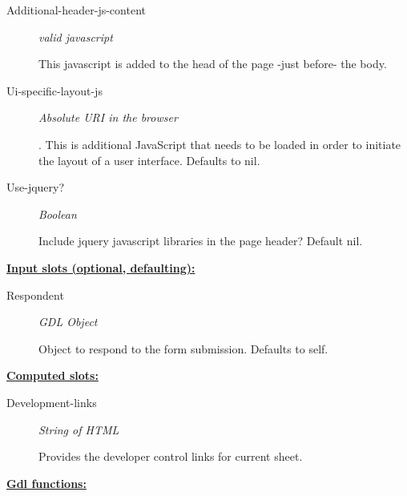 \documentclass [11pt]{book}
\begin{document}
\begin{itemize}
\begin{description}
\item [Additional-header-js-content]
\emph{valid javascript}

 This javascript is added to the head of the page -just before- the body.


\item [Ui-specific-layout-js]
\emph{Absolute URI in the browser}

.
This is additional JavaScript that needs to be loaded in order to initiate the layout of a user
interface. Defaults to nil.




\item [Use-jquery?]
\emph{Boolean}

 Include jquery javascript libraries in the page header?
Default nil.




\end{description}






\textbf{
\underline{Input slots (optional, defaulting):}}

\begin{description}

\item [Respondent]
\emph{GDL Object}

 Object to respond to the form submission. Defaults to self.




\end{description}






\textbf{
\underline{Computed slots:}}

\begin{description}

\item [Development-links]
\emph{String of HTML}

 Provides the developer control links for current sheet.




\end{description}






\textbf{
\underline{Gdl functions:}}


\end{itemize}
\end{document}
